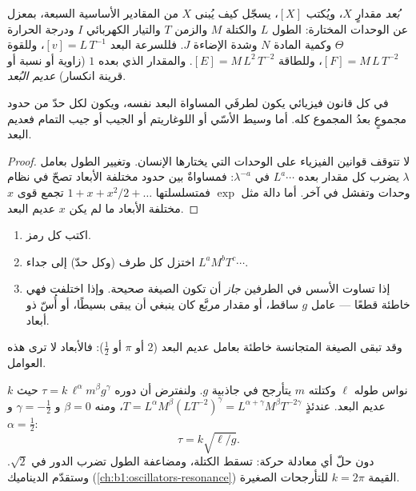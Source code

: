 \begin{definition}[البُعد]\label{def:b1:units-dimensions:dimension}
\emph{بُعد} مقدارٍ $X$، ويُكتب $[X]$، يسجّل كيف يُبنى $X$ من المقادير
الأساسية السبعة، بمعزل عن الوحدات المختارة: الطول $L$ والكتلة $M$
والزمن $T$ والتيار الكهربائي $I$ ودرجة الحرارة $\Theta$ وكمية المادة
$N$ وشدة الإضاءة $J$. فللسرعة البعد $[v] = L\,T^{-1}$، وللقوة
$[F] = M\,L\,T^{-2}$، وللطاقة $[E] = M\,L^2\,T^{-2}$. والمقدار الذي
بعده $1$ (زاوية أو نسبة أو قرينة انكسار) \emph{عديم البُعد}.
\end{definition}

\begin{theorem}\label{thm:b1:units-dimensions:homogeneity}
في كل قانون فيزيائي يكون لطرفَي المساواة البعد نفسه، ويكون لكل حدّ من
حدود مجموعٍ بعدُ المجموع كله. أما وسيط الأسّي أو اللوغاريتم أو الجيب
أو جيب التمام فعديم البعد.
\end{theorem}

\begin{proof}
لا تتوقف قوانين الفيزياء على الوحدات التي يختارها الإنسان. وتغيير
 الطول بعامل $\lambda$ يضرب كل مقدار بعده $L^a \cdots$ في
$\lambda^{-a}$: فمساواةٌ بين حدود مختلفة الأبعاد تصحّ في نظام وحدات
وتفشل في آخر. أما دالة مثل $\exp$ فمتسلسلتها
$1 + x + x^2/2 + \dots$ تجمع قوى $x$ مختلفة الأبعاد ما لم يكن $x$
عديم البعد.
\end{proof}

\begin{method}\label{met:b1:units-dimensions:check}
\begin{enumerate}
  \item اكتب  كل رمز.
  \item اختزل كل طرف (وكل حدّ) إلى جداء $L^a M^b T^c \cdots$.
  \item إذا تساوت الأسس في الطرفين \emph{جاز} أن تكون الصيغة صحيحة.
        وإذا اختلفت فهي خاطئة قطعًا --- عامل $g$ ساقط، أو مقدار
        مربَّع كان ينبغي أن يبقى بسيطًا، أو أُسّ ذو أبعاد.
\end{enumerate}
وقد تبقى الصيغة المتجانسة خاطئة بعامل عديم البعد ($2$ أو $\pi$ أو
$\tfrac12$): فالأبعاد لا ترى هذه العوامل.
\end{method}

\begin{example}\label{ex:b1:units-dimensions:pendulum}
نواس طوله $\ell$ وكتلته $m$ يتأرجح في جاذبية $g$. ولنفترض أن دوره
$\tau = k\,\ell^\alpha m^\beta g^\gamma$ حيث $k$ عديم البعد. عندئذٍ
$T = L^\alpha M^\beta (L T^{-2})^\gamma =
L^{\alpha+\gamma} M^\beta T^{-2\gamma}$، ومنه $\beta = 0$ و
$\gamma = -\tfrac12$ و $\alpha = \tfrac12$:
\[
\tau = k\sqrt{\ell/g} .
\]
دون حلّ أي معادلة حركة: تسقط الكتلة، ومضاعفة الطول تضرب الدور في
$\sqrt2$. وستقدّم الديناميك (\cref{ch:b1:oscillators-resonance})
القيمة $k = 2\pi$ للتأرجحات الصغيرة.
\end{example}

